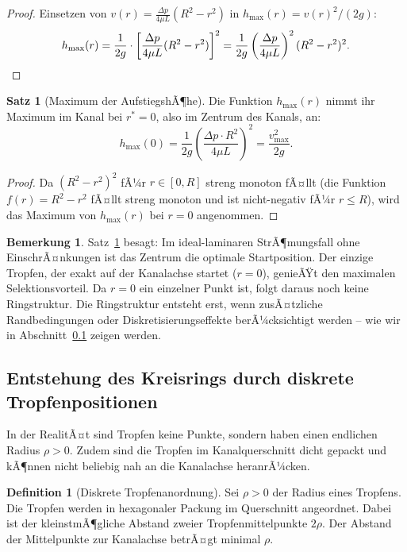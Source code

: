 ﻿\documentclass[a4paper,12pt]{article}
\theoremstyle{definition}
\newtheorem{definition}{Definition}
\newtheorem{satz}{Satz}
\newtheorem{bemerkung}{Bemerkung}
\begin{document}
\begin{proof}
    Einsetzen von $v(r) = \frac{\Delta p}{4\mu L}(R^2 - r^2)$ in $h_{\max}(r) = v(r)^2/(2g)$:
    \[
    h_{\max}(r) = \frac{1}{2g} \cdot \left[\frac{\Delta p}{4\mu L}(R^2 - r^2)\right]^2
    = \frac{1}{2g}\left(\frac{\Delta p}{4\mu L}\right)^2(R^2 - r^2)^2. \qedhere
    \]
\end{proof}

\begin{satz}[Maximum der AufstiegshÃ¶he]
\label{satz:maximum}
    Die Funktion $h_{\max}(r)$ nimmt ihr Maximum im Kanal bei $r^* = 0$, also im Zentrum
    des Kanals, an:
    \[
    h_{\max}(0) = \frac{1}{2g}\left(\frac{\Delta p \cdot R^2}{4\mu L}\right)^2 = \frac{v_{\max}^2}{2g}.
    \]
\end{satz}

\begin{proof}
    Da $(R^2 - r^2)^2$ fÃ¼r $r \in [0, R]$ streng monoton fÃ¤llt (die Funktion
    $f(r) = R^2 - r^2$ fÃ¤llt streng monoton und ist nicht-negativ fÃ¼r $r \le R$),
    wird das Maximum von $h_{\max}(r)$ bei $r = 0$ angenommen. \qedhere
\end{proof}

\begin{bemerkung}
Satz~\ref{satz:maximum} besagt: Im ideal-laminaren StrÃ¶mungsfall ohne EinschrÃ¤nkungen
ist das Zentrum die optimale Startposition. Der einzige Tropfen, der exakt auf der
Kanalachse startet ($r=0$), genieÃŸt den maximalen Selektionsvorteil.
Da $r=0$ ein einzelner Punkt ist, folgt daraus noch keine Ringstruktur.
Die Ringstruktur entsteht erst, wenn zusÃ¤tzliche Randbedingungen oder
Diskretisierungseffekte berÃ¼cksichtigt werden -- wie wir in Abschnitt~\ref{sec:ring}
zeigen werden.
\end{bemerkung}

\subsection{Entstehung des Kreisrings durch diskrete Tropfenpositionen}
\label{sec:ring}

In der RealitÃ¤t sind Tropfen keine Punkte, sondern haben einen endlichen Radius
$\rho > 0$. Zudem sind die Tropfen im Kanalquerschnitt dicht gepackt und kÃ¶nnen
nicht beliebig nah an die Kanalachse heranrÃ¼cken.

\begin{definition}[Diskrete Tropfenanordnung]
    Sei $\rho > 0$ der Radius eines Tropfens. Die Tropfen werden in hexagonaler
    Packung im Querschnitt angeordnet. Dabei ist der kleinstmÃ¶gliche Abstand zweier
    Tropfenmittelpunkte $2\rho$. Der Abstand der Mittelpunkte zur Kanalachse betrÃ¤gt
    minimal $\rho$.
\end{definition}
\end{document}
